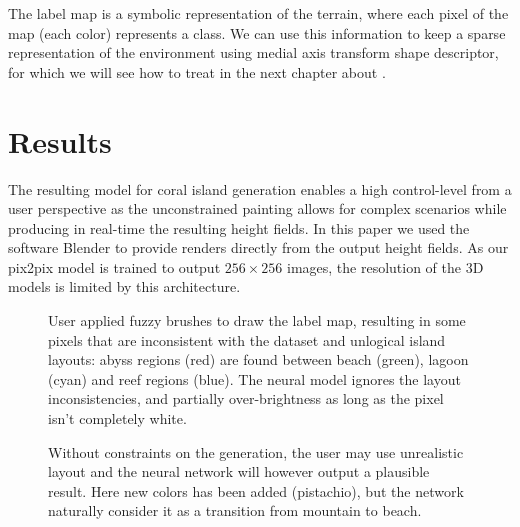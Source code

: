 The label map is a symbolic representation of the terrain, where each pixel of the map (each color) represents a class. We can use this information to keep a sparse representation of the environment using medial axis transform shape descriptor, for which we will see how to treat in the next chapter about .


\section{Results}
\label{sec:coral-island-results}


The resulting model for coral island generation enables a high control-level from a user perspective as the unconstrained painting allows for complex scenarios while producing in real-time the resulting height fields. In this paper we used the software Blender to provide renders directly from the output height fields. As our pix2pix model is trained to output $256\times256$ images, the resolution of the 3D models is limited by this architecture.

\begin{figure}
    \caption{User applied fuzzy brushes to draw the label map, resulting in some pixels that are inconsistent with the dataset and unlogical island layouts: abyss regions (red) are found between beach (green), lagoon (cyan) and reef regions (blue). The neural model ignores the layout inconsistencies, and partially over-brightness as long as the pixel isn't completely white. }
    \label{fig:coral-island-results-fuzzy}
\end{figure}
\begin{figure}
    \caption{Without constraints on the generation, the user may use unrealistic layout and the neural network will however output a plausible result. Here new colors has been added (pistachio), but the network naturally consider it as a transition from mountain to beach. }
    \label{fig:coral-island-results_dino}
\end{figure}

